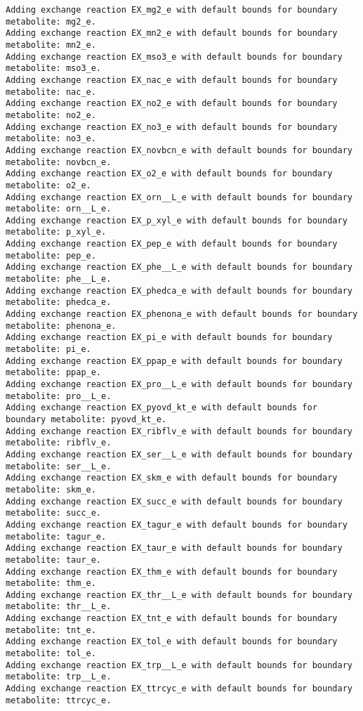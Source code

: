 \documentclass[
  letterpaper,
  DIV=11,
  numbers=noendperiod]{scrartcl}
\begin{document}
\begin{verbatim}
Adding exchange reaction EX_mg2_e with default bounds for boundary metabolite: mg2_e.
Adding exchange reaction EX_mn2_e with default bounds for boundary metabolite: mn2_e.
Adding exchange reaction EX_mso3_e with default bounds for boundary metabolite: mso3_e.
Adding exchange reaction EX_nac_e with default bounds for boundary metabolite: nac_e.
Adding exchange reaction EX_no2_e with default bounds for boundary metabolite: no2_e.
Adding exchange reaction EX_no3_e with default bounds for boundary metabolite: no3_e.
Adding exchange reaction EX_novbcn_e with default bounds for boundary metabolite: novbcn_e.
Adding exchange reaction EX_o2_e with default bounds for boundary metabolite: o2_e.
Adding exchange reaction EX_orn__L_e with default bounds for boundary metabolite: orn__L_e.
Adding exchange reaction EX_p_xyl_e with default bounds for boundary metabolite: p_xyl_e.
Adding exchange reaction EX_pep_e with default bounds for boundary metabolite: pep_e.
Adding exchange reaction EX_phe__L_e with default bounds for boundary metabolite: phe__L_e.
Adding exchange reaction EX_phedca_e with default bounds for boundary metabolite: phedca_e.
Adding exchange reaction EX_phenona_e with default bounds for boundary metabolite: phenona_e.
Adding exchange reaction EX_pi_e with default bounds for boundary metabolite: pi_e.
Adding exchange reaction EX_ppap_e with default bounds for boundary metabolite: ppap_e.
Adding exchange reaction EX_pro__L_e with default bounds for boundary metabolite: pro__L_e.
Adding exchange reaction EX_pyovd_kt_e with default bounds for boundary metabolite: pyovd_kt_e.
Adding exchange reaction EX_ribflv_e with default bounds for boundary metabolite: ribflv_e.
Adding exchange reaction EX_ser__L_e with default bounds for boundary metabolite: ser__L_e.
Adding exchange reaction EX_skm_e with default bounds for boundary metabolite: skm_e.
Adding exchange reaction EX_succ_e with default bounds for boundary metabolite: succ_e.
Adding exchange reaction EX_tagur_e with default bounds for boundary metabolite: tagur_e.
Adding exchange reaction EX_taur_e with default bounds for boundary metabolite: taur_e.
Adding exchange reaction EX_thm_e with default bounds for boundary metabolite: thm_e.
Adding exchange reaction EX_thr__L_e with default bounds for boundary metabolite: thr__L_e.
Adding exchange reaction EX_tnt_e with default bounds for boundary metabolite: tnt_e.
Adding exchange reaction EX_tol_e with default bounds for boundary metabolite: tol_e.
Adding exchange reaction EX_trp__L_e with default bounds for boundary metabolite: trp__L_e.
Adding exchange reaction EX_ttrcyc_e with default bounds for boundary metabolite: ttrcyc_e.

\end{verbatim}
\end{document}
